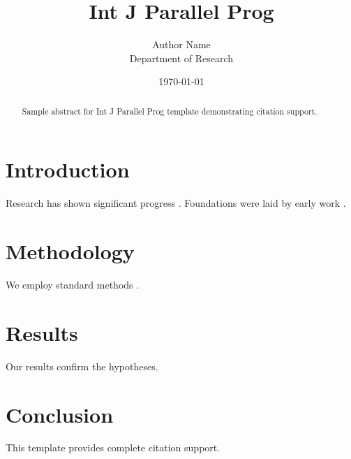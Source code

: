 \documentclass{iopart}
\title{Int J Parallel Prog}
\author{Author Name \\ \small Department of Research}
\date{\today}
\begin{document}
\maketitle

\begin{abstract}
Sample abstract for Int J Parallel Prog template demonstrating citation support.
\end{abstract}

\section{Introduction}
Research has shown significant progress \citep{einstein1905}. Foundations were laid by early work \citep{turing1950}.

\section{Methodology}
We employ standard methods \citep{knuth1984}.

\section{Results}
Our results confirm the hypotheses.

\section{Conclusion}
This template provides complete citation support.



\end{document}
